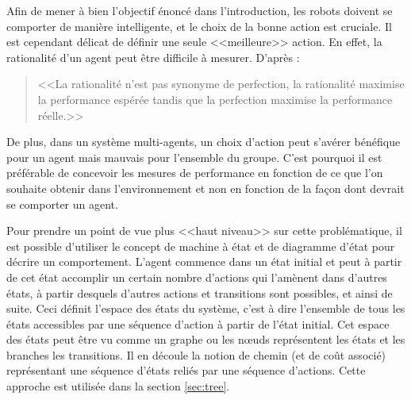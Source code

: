 Afin de mener à bien l'objectif énoncé dans l'introduction, les robots doivent se comporter de manière intelligente, et le choix de la bonne action est cruciale. Il est cependant délicat de définir une seule <<meilleure>> action. En effet, la rationalité d'un agent peut être difficile à mesurer. D'après \cite{AIBrique}:
\begin{quote}
  <<La rationalité n'est pas synonyme de perfection, la rationalité maximise la performance espérée tandis que la perfection maximise la performance réelle.>>
\end{quote}

De plus, dans un système multi-agents, un choix d'action peut s'avérer bénéfique pour un agent mais mauvais pour l'ensemble du groupe. C'est pourquoi il est préférable de concevoir les mesures de performance en fonction de ce que l'on souhaite obtenir dans l'environnement et non en fonction de la façon dont devrait se comporter un agent.

Pour prendre un point de vue plus <<haut niveau>> sur cette problématique, il est possible d'utiliser le concept de machine à état et de diagramme d'état pour décrire un comportement. L'agent commence dans un état initial et peut à partir de cet état accomplir un certain nombre d'actions qui l'amènent dans d'autres états, à partir desquels d'autres actions et transitions sont possibles, et ainsi de suite. Ceci définit l'espace des états du système, c'est à dire l'ensemble de tous les états accessibles par une séquence d'action à partir de l'état initial. Cet espace des états peut être vu comme un graphe ou les n\oe{}uds représentent les états et les branches les transitions. Il en découle la notion de chemin (et de coût associé) représentant une séquence d'états reliés par une séquence d'actions. Cette approche est utilisée dans la section \ref{sec:tree}.~\cite{foraging, AIBrique}

